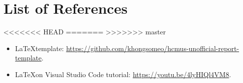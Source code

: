 \section{List of References}
<<<<<<< HEAD
\label{sec:list-of-references}
=======
\label{sec:references-list}
>>>>>>> master

\begin{itemize}
    \item \LaTeX \space template: \url{https://github.com/khongsomeo/hcmus-unofficial-report-template}.
    \item \LaTeX \space on Visual Studio Code tutorial: \url{https://youtu.be/4lyHIQl4VM8}.
\end{itemize}